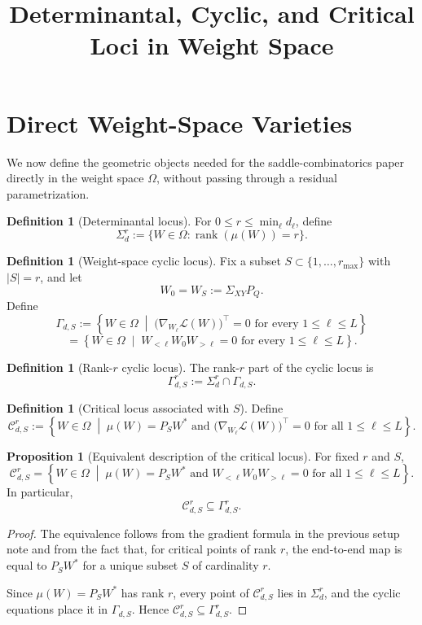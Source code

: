 \documentclass{article}
\title{Determinantal, Cyclic, and Critical Loci in Weight Space}
\date{}
\newcommand{\rk}{\operatorname{rank}}
\theoremstyle{definition}
\newtheorem{proposition}[theorem]{Proposition}
\newtheorem{definition}[theorem]{Definition}
\begin{document}
\maketitle

\section{Direct Weight-Space Varieties}

We now define the geometric objects needed for the saddle-combinatorics paper directly in the weight space $\Omega$, without passing through a residual parametrization.

\begin{definition}[Determinantal locus]
For $0\le r\le \min_\ell d_\ell$, define
\[
\Sigma_d^r
:=
\{W\in \Omega : \rk(\mu(W))=r\}.
\]
\end{definition}

\begin{definition}[Weight-space cyclic locus]
Fix a subset $S\subset \{1,\dots,r_{\max}\}$ with $|S|=r$, and let
\[
W_0=W_S:=\Sigma_{XY}P_Q.
\]
Define
\[
\Gamma_{d,S}
:=
\left\{
W\in \Omega
\;\middle|\;
\bigl(\nabla_{W_\ell}\mathcal L(W)\bigr)^\top=0
\text{ for every }1\le \ell\le L
\right\}
\]
\[
=
\left\{
W\in \Omega
\;\middle|\;
W_{<\ell}W_0W_{>\ell}=0
\text{ for every }1\le \ell\le L
\right\}.
\]
\end{definition}

\begin{definition}[Rank-$r$ cyclic locus]
The rank-$r$ part of the cyclic locus is
\[
\Gamma_{d,S}^r
:=
\Sigma_d^r\cap \Gamma_{d,S}.
\]
\end{definition}

\begin{definition}[Critical locus associated with $S$]
Define
\[
\mathcal C_{d,S}^r
:=
\left\{
W\in \Omega
\;\middle|\;
\mu(W)=P_SW^\ast
\text{ and }
\bigl(\nabla_{W_\ell}\mathcal L(W)\bigr)^\top=0
\text{ for all }1\le \ell\le L
\right\}.
\]
\end{definition}

\begin{proposition}[Equivalent description of the critical locus]
For fixed $r$ and $S$,
\[
\mathcal C_{d,S}^r
=
\left\{
W\in \Omega
\;\middle|\;
\mu(W)=P_SW^\ast
\text{ and }
W_{<\ell}W_0W_{>\ell}=0
\text{ for all }1\le \ell\le L
\right\}.
\]
In particular,
\[
\mathcal C_{d,S}^r \subseteq \Gamma_{d,S}^r.
\]
\end{proposition}

\begin{proof}
The equivalence follows from the gradient formula in the previous setup note and from the fact that, for critical points of rank $r$, the end-to-end map is equal to $P_SW^\ast$ for a unique subset $S$ of cardinality $r$.

Since $\mu(W)=P_SW^\ast$ has rank $r$, every point of $\mathcal C_{d,S}^r$ lies in $\Sigma_d^r$, and the cyclic equations place it in $\Gamma_{d,S}$. Hence $\mathcal C_{d,S}^r\subseteq \Gamma_{d,S}^r$.
\end{proof}
\end{document}
